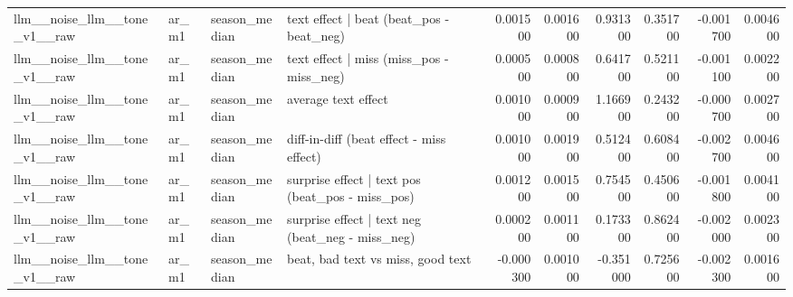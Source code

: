 \begin{table}
\begin{tabular}{llllrrrrrr}
llm\_\_noise\_llm\_\_tone\_v1\_\_raw & ar\_m1 & season\_median & text effect | beat  (beat\_pos - beat\_neg) & 0.001500 & 0.001600 & 0.931300 & 0.351700 & -0.001700 & 0.004600 \\
llm\_\_noise\_llm\_\_tone\_v1\_\_raw & ar\_m1 & season\_median & text effect | miss  (miss\_pos - miss\_neg) & 0.000500 & 0.000800 & 0.641700 & 0.521100 & -0.001100 & 0.002200 \\
llm\_\_noise\_llm\_\_tone\_v1\_\_raw & ar\_m1 & season\_median & average text effect & 0.001000 & 0.000900 & 1.166900 & 0.243200 & -0.000700 & 0.002700 \\
llm\_\_noise\_llm\_\_tone\_v1\_\_raw & ar\_m1 & season\_median & diff-in-diff (beat effect - miss effect) & 0.001000 & 0.001900 & 0.512400 & 0.608400 & -0.002700 & 0.004600 \\
llm\_\_noise\_llm\_\_tone\_v1\_\_raw & ar\_m1 & season\_median & surprise effect | text pos (beat\_pos - miss\_pos) & 0.001200 & 0.001500 & 0.754500 & 0.450600 & -0.001800 & 0.004100 \\
llm\_\_noise\_llm\_\_tone\_v1\_\_raw & ar\_m1 & season\_median & surprise effect | text neg (beat\_neg - miss\_neg) & 0.000200 & 0.001100 & 0.173300 & 0.862400 & -0.002000 & 0.002300 \\
llm\_\_noise\_llm\_\_tone\_v1\_\_raw & ar\_m1 & season\_median & beat, bad text vs miss, good text & -0.000300 & 0.001000 & -0.351000 & 0.725600 & -0.002300 & 0.001600 \\
\bottomrule
\end{tabular}
\end{table}
